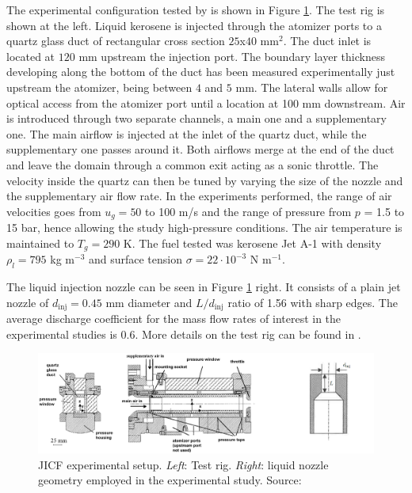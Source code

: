 The experimental configuration tested by  is shown in Figure \ref{fig:experiment_JICF_DLR}. The test rig is shown at the left. Liquid kerosene is injected through the atomizer ports to a quartz glass duct of rectangular cross section $25$x$40$ mm$^2$. The duct inlet is located at $120$ mm upstream the injection port. The boundary layer thickness developing along the bottom of the duct has been measured experimentally just upstream the atomizer, being between $4$ and $5$ mm. The lateral walls allow for optical access from the atomizer port until a location at 100 mm downstream. Air is introduced through two separate channels, a main one and a supplementary one. The main airflow is injected at the inlet of the quartz duct, while the supplementary one passes around it. Both airflows merge at the end of the duct and leave the domain through a common exit acting as a sonic throttle. The velocity inside the quartz can then be tuned by varying the size of the nozzle and the supplementary air flow rate. In the experiments performed, the range of air velocities goes from $u_g = 50$ to 100 m/s and the range of pressure from $p$ = 1.5 to 15 bar, hence allowing the study high-pressure conditions. The air temperature is maintained to $T_g = 290$ K. The fuel tested was kerosene Jet A-1 with density $\rho_l = 795$ kg m$^{-3}$ and surface tension $\sigma = 22 \cdot 10^{-3}$ N m$^{-1}$.

The liquid injection nozzle can be seen in Figure \ref{fig:experiment_JICF_DLR} right. It consists of a plain jet nozzle of $d_\mathrm{inj} =  0.45$ mm diameter and $L/d_\mathrm{inj}$ ratio of 1.56 with sharp edges. The average discharge coefficient for the mass flow rates of interest in the experimental studies is $0.6$. More details on the test rig can be found in .

\begin{figure}[h!]
	\centering
	\includegraphics[scale=0.35]{./part2_developments/figures_ch5_resolved_JICF/experiment_JICF_DLR}
	\caption[JICF experimental setup]{JICF experimental setup. \textsl{Left}: Test rig. \textsl{Right}: liquid nozzle geometry employed in the experimental study. Source: }
	\label{fig:experiment_JICF_DLR}
\end{figure}


